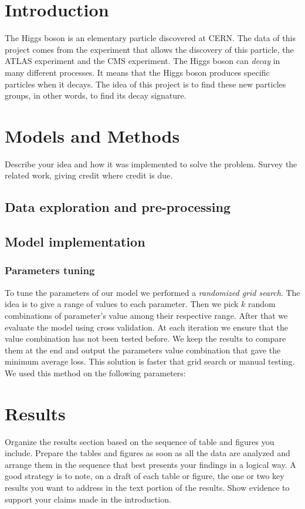 \documentclass[10pt,conference,compsocconf]{IEEEtran}
\begin{document}
\section{Introduction}\label{sec: introduction}
    The Higgs boson is an elementary particle discovered at CERN. The data of this project comes from the experiment that allows the discovery of this particle, the ATLAS experiment and the CMS experiment. The Higgs boson can \textit{decay} in many different processes. It means that the Higgs boson produces specific particles when it decays. The idea of this project is to find these new particles groups, in other words,  to find its decay signature.
\section{Models and Methods}\label{sec: models_methods}
    Describe your idea and how it was implemented to solve
    the problem. Survey the related work, giving credit where credit is
    due.
    \subsection{Data exploration and pre-processing}\label{subsec:data_cleaning}
    \subsection{Model implementation}
        \subsubsection{Parameters tuning}
            To tune the parameters of our model we performed a \textit{randomized grid search}. The idea is to give a range of values to each parameter. Then we pick $k$ random combinations of parameter's value among their respective range. After that we evaluate the model using cross validation. At each iteration we ensure that the value combination has not been tested before. We keep the results to compare them at the end and output the parameters value combination that gave the minimum average loss. This solution is faster that grid search or manual testing. We used this method on the following parameters: 
\section{Results}\label{sec: results}
    Organize the results section based on the sequence of table and
    figures you include. Prepare the tables and figures as soon as all
    the data are analyzed and arrange them in the sequence that best
    presents your findings in a logical way. A good strategy is to note,
    on a draft of each table or figure, the one or two key results you
    want to address in the text portion of the results.
    Show evidence to support your claims made in the
    introduction.
\end{document}
